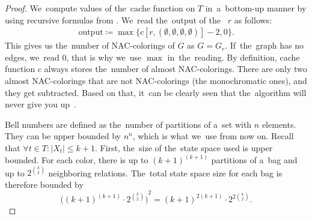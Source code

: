 %
%
\begin{proof}
	We~compute values of the~cache function on \( T \) in~a~bottom-up manner
	by using recursive formulas from
	.
	We~read the~output of the~\RootNode{} \( r \) as follows:
	\begin{align*}
		\text{output} \coloneqq \max\{c[r, (\emptyset,\emptyset,\emptyset,\emptyset)] - 2, 0\}.
	\end{align*}
	This gives us the~number of NAC-colorings of \( G \) as \( G = G_r \).
	If~the~graph has no edges, we~read \( 0 \), that is why we~use \( \max{} \) in~the~reading.
	By definition, cache function \( c \) always stores the~number of almost NAC-colorings.
	There are only two almost NAC-colorings
	that are not NAC-colorings (the monochromatic ones), and they get subtracted.
	Based on that, it~can be clearly seen that the~algorithm
	will never give you up~\cite{never_gonna_give_you_up}.

	Bell numbers are defined as
	the~number of partitions of a~set with \( n \) elements.
	They can be upper bounded by \( n^n \), which is what we~use from now on.
	Recall that \( \forall t \in T : |X_t| \le k+1 \).
	First, the~size of the~state space used is upper bounded.
	For each color, there is up to \( {(k+1)}^{(k+1)} \) partitions of a~bag and
	up to \( 2^{\binom{k}{2}} \) neighboring relations.
	The~total state space size for each bag is therefore bounded by
	\[ {\Big({(k+1)}^{(k+1)} \cdot 2^{\binom{k}{2}} \Big)}^2 = {(k+1)}^{2(k+1)} \cdot 2^{2 \binom{k}{2}}. \]


\end{proof}
